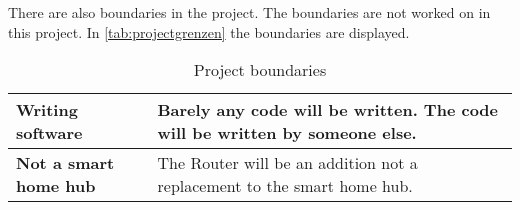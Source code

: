 There are also boundaries in the project. The boundaries are not worked on in this project. In \autoref{tab:projectgrenzen} the boundaries are displayed.

\begin{table}[H]
    \centering
    \begin{tabular}{l| p{8cm}}
        \bf Writing software & Barely any code will be written. The code will be written by someone else.\\\hline
        \bf Not a smart home hub & The Router will be an addition not a replacement to the smart home hub.\\
        \end{tabular}
    \caption{Project boundaries}
    \label{tab:projectgrenzen}
\end{table}